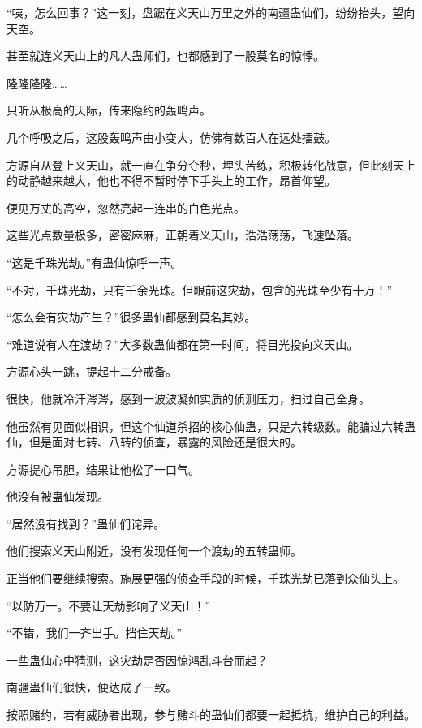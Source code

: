 
\begin{this_body}



“咦，怎么回事？”这一刻，盘踞在义天山万里之外的南疆蛊仙们，纷纷抬头，望向天空。

甚至就连义天山上的凡人蛊师们，也都感到了一股莫名的惊悸。

隆隆隆隆……

只听从极高的天际，传来隐约的轰鸣声。

几个呼吸之后，这股轰鸣声由小变大，仿佛有数百人在远处擂鼓。

方源自从登上义天山，就一直在争分夺秒，埋头苦练，积极转化战意，但此刻天上的动静越来越大，他也不得不暂时停下手头上的工作，昂首仰望。

便见万丈的高空，忽然亮起一连串的白色光点。

这些光点数量极多，密密麻麻，正朝着义天山，浩浩荡荡，飞速坠落。

“这是千珠光劫。”有蛊仙惊呼一声。

“不对，千珠光劫，只有千余光珠。但眼前这灾劫，包含的光珠至少有十万！”

“怎么会有灾劫产生？”很多蛊仙都感到莫名其妙。

“难道说有人在渡劫？”大多数蛊仙都在第一时间，将目光投向义天山。

方源心头一跳，提起十二分戒备。

很快，他就冷汗涔涔，感到一波波凝如实质的侦测压力，扫过自己全身。

他虽然有见面似相识，但这个仙道杀招的核心仙蛊，只是六转级数。能骗过六转蛊仙，但是面对七转、八转的侦查，暴露的风险还是很大的。

方源提心吊胆，结果让他松了一口气。

他没有被蛊仙发现。

“居然没有找到？”蛊仙们诧异。

他们搜索义天山附近，没有发现任何一个渡劫的五转蛊师。

正当他们要继续搜索。施展更强的侦查手段的时候，千珠光劫已落到众仙头上。

“以防万一。不要让天劫影响了义天山！”

“不错，我们一齐出手。挡住天劫。”

一些蛊仙心中猜测，这灾劫是否因惊鸿乱斗台而起？

南疆蛊仙们很快，便达成了一致。

按照赌约，若有威胁者出现，参与赌斗的蛊仙们都要一起抵抗，维护自己的利益。


\end{this_body}
